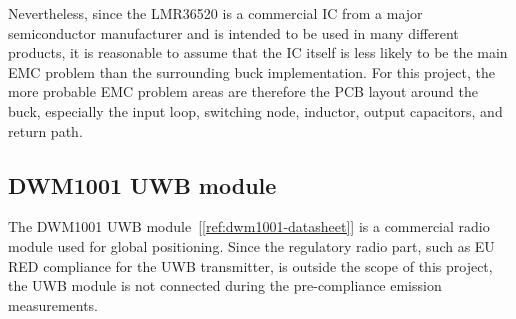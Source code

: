 Nevertheless, since the LMR36520 is a commercial IC from a major semiconductor
manufacturer and is intended to be used in many different products, it is reasonable to
assume that the IC itself is less likely to be the main EMC problem than the surrounding
buck implementation. For this project, the more probable EMC problem areas are therefore
the PCB layout around the buck, especially the input loop, switching node, inductor, output
capacitors, and return path.

\subsection{DWM1001 UWB module}
The DWM1001 UWB module~[\ref{ref:dwm1001-datasheet}] is a commercial radio module used for global positioning.
Since the regulatory radio part, such as EU RED compliance for the UWB transmitter, is
outside the scope of this project, the UWB module is not connected during the
pre-compliance emission measurements.
